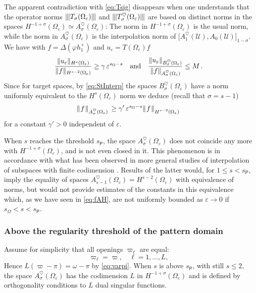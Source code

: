 \documentclass[titlepage,12pt]{amsart}
\theoremstyle{definition}
\theoremstyle{remark}
\numberwithin{equation}{section}
\newcommand{\ee}{\hskip0.15ex}
\newcommand{\me}{\hskip-0.15ex}
\newcommand{\dd}[1]{_{\raise-0.6ex\hbox{$\scriptstyle #1$}}}
\newcommand {\DNorm}[2]{ \mathchoice
    {\|\ee #1\ee\|\dd{#2}\,}
    {\| #1 \|_{#2}}
    {\| #1 \|_{#2}}
    {\| #1 \|_{#2}} }
\newcommand{\sU}{{\mathscr U}}
\newcommand{\rP}{{\mathsf{P}}}
\begin{document}
The apparent contradiction with \eqref{eq:Tsig} disappears when one understands that the operator norms $|\me|\me| T_\sigma(\Omega_\varepsilon) |\me|\me|$ and $|\me|\me| T_\sigma^\heartsuit(\Omega_\varepsilon) |\me|\me|$ are based on distinct norms in the spaces $H^{-1+\sigma}(\Omega_\varepsilon)\simeq A_\sigma^\heartsuit(\Omega_\varepsilon)$: The norm in $H^{-1+\sigma}(\Omega_\varepsilon)$ is the usual norm, while the norm in $A_\sigma^\heartsuit(\Omega_\varepsilon)$ is the interpolation norm of $\big[A_1^\heartsuit(\sU),A_0(\sU)\big]_{1-\sigma}$. We have with $f=\Delta(\varphi h^+_1)$ and $u_\varepsilon=T(\Omega_\varepsilon)f$
\[
   \frac{\DNorm{u_\varepsilon}{H^s(\Omega_\varepsilon)}}{\DNorm{f}{H^{s-2}(\Omega_\varepsilon)}}
   \ge \gamma\, \varepsilon^{s_\Omega-s}
   \quad\mbox{and}\quad
   \frac{\DNorm{u_\varepsilon}{B_\sigma^\heartsuit(\Omega_\varepsilon)}}
   {\DNorm{f}{A_\sigma^\heartsuit(\Omega_\varepsilon)}} \le M\,.
\]
Since for target spaces, by \eqref{eq:StInterp} the spaces $B_\sigma^\heartsuit(\Omega_\varepsilon)$ have a norm uniformly equivalent to the $H^s(\Omega_\varepsilon)$ norm we deduce (recall that $\sigma=s-1$)
\begin{equation}
\label{eq:fAH}
   \DNorm{f}{A_\sigma^\heartsuit(\Omega_\varepsilon)} \ge \gamma'\,
   \varepsilon^{s_\Omega-s} \DNorm{f}{H^{s-2}(\Omega_\varepsilon)}
\end{equation}
for a constant $\gamma'>0$ independent of $\varepsilon$.

When $s$ reaches the threshold $s_\rP$, the space $A_\sigma^\heartsuit(\Omega_\varepsilon)$ does not coincide any more with $H^{-1+\sigma}(\Omega_\varepsilon)$, and is not even closed in it. 
This phenomenon is in accordance with what has been observed in more general studies of interpolation of subspaces with finite codimension \cite{Asekritova:2015,Zerulla:2022}.
Results of the latter would, for $1\le s<s_{\rP}$, imply the equality of spaces 
$A_{s-1}^\heartsuit(\Omega_\varepsilon)=H^{s-2}(\Omega_\varepsilon)$ 
with equivalence of norms, but would not provide estimates of the constants in this equivalence which, as we have seen in \eqref{eq:fAH}, are not uniformly bounded as $\varepsilon\to0$ if $s_{\Omega}<s<s_{\rP}$.

\subsubsection{Above the regularity threshold of the pattern domain}
Assume for simplicity that all openings $\varpi_\ell$ are equal:
\[
   \varpi_\ell=\varpi,\quad \ell=1,\ldots,L,
\]
Hence $L(\varpi-\pi)=\omega-\pi$ by \eqref{eq:varpi}. When $s$ is above $s_\rP$, with still $s\le2$, the space $A_\sigma^\heartsuit(\Omega_\varepsilon)$ has the codimension $L$ in $H^{-1+\sigma}(\Omega_\varepsilon)$ and is defined by orthogonality conditions to $L$ dual singular functions. 
\end{document}
